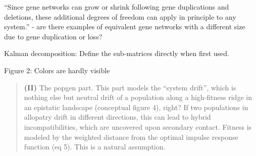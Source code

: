 
\begin{point}{}
    ``Since gene networks can grow or shrink following gene duplications and deletions,
these additional degrees of freedom can apply in principle to any system.'' - are there examples of equivalent gene networks with a different size due to gene duplication or loss?
\end{point}


\begin{point}{Kalman decomposition:}
    Define the sub-matrices directly when first used.
\end{point}


\begin{point}{Figure 2:}
    Colors are hardly visible
\end{point}


\begin{quote}
    \textbf{(II)} The popgen part. This part models the ``system drift'', which is nothing else
but neutral drift of a population along a high-fitness ridge in an epistatic
landscape (conceptual figure 4), right? If two populations in allopatry drift
in different directions, this can lead to hybrid incompatibilities, which are
uncovered upon secondary contact. Fitness is modeled by the weighted distance
from the optimal impulse response function (eq 5). This is a natural
assumption.
\end{quote}


